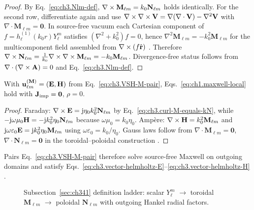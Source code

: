 \begin{proof}
By Eq.~\eqref{eq:ch3.Nlm-def}, $\nabla\times\mathbf{M}_{\ell m}=k_0\mathbf{N}_{\ell m}$ holds identically. For the second row, differentiate again and use $\nabla\times\nabla\times\mathbf{V}=\nabla(\nabla\cdot\mathbf{V})-\nabla^{2}\mathbf{V}$ with $\nabla\cdot\mathbf{M}_{\ell m}=\mathbf{0}$. In source-free vacuum each Cartesian component of $f=h_\ell^{(1)}(k_0 r)Y_\ell^m$ satisfies $(\nabla^{2}+k_0^{2})f=0$, hence $\nabla^{2}\mathbf{M}_{\ell m}=-k_0^{2}\mathbf{M}_{\ell m}$ for the multicomponent field assembled from $\nabla\times(f\hat{\mathbf{r}})$ \cite{jackson1999,stratton1941}. Therefore $\nabla\times\mathbf{N}_{\ell m}=\frac{1}{k_0}\nabla\times\nabla\times\mathbf{M}_{\ell m}=-k_0\mathbf{M}_{\ell m}$. Divergence-free status follows from $\nabla\cdot(\nabla\times\mathbf{A})=0$ and Eq.~\eqref{eq:ch3.Nlm-def}.
\end{proof}
\begin{theorem}
\label{thm:ch3.VSH-maxwell-pair}
With $\mathbf{u}_{\ell m}^{(\mathbf{M})}=(\mathbf{E},\mathbf{H})$ from Eq.~\eqref{eq:ch3.VSH-M-pair}, Eqs.~\eqref{eq:ch1.maxwell-local} hold with $\mathbf{J}_{\mathrm{imp}}=\mathbf{0}$, $\rho=0$.
\end{theorem}
\begin{proof}
Faraday: $\nabla\times\mathbf{E}=\mathrm{j}\eta_0 k_0^2\mathbf{N}_{\ell m}$ by Eq.~\eqref{eq:ch3.curl-M-equals-kN}, while $-\mathrm{j}\omega\mu_0\mathbf{H}=-\mathrm{j} k_0^2\eta_0\mathbf{N}_{\ell m}$ because $\omega\mu_0=k_0\eta_0$. Amp\`ere: $\nabla\times\mathbf{H}=k_0^2\mathbf{M}_{\ell m}$ and $\mathrm{j}\omega\varepsilon_0\mathbf{E}=\mathrm{j} k_0^2\eta_0\mathbf{M}_{\ell m}$ using $\omega\varepsilon_0=k_0/\eta_0$. Gauss laws follow from $\nabla\cdot\mathbf{M}_{\ell m}=\mathbf{0}$, $\nabla\cdot\mathbf{N}_{\ell m}=\mathbf{0}$ in the toroidal--poloidal construction \cite{stratton1941}.
\end{proof}
Pairs Eq.~\eqref{eq:ch3.VSH-M-pair} therefore solve source-free Maxwell on outgoing domains and satisfy
Eqs.~\eqref{eq:ch3.vector-helmholtz-E}--\eqref{eq:ch3.vector-helmholtz-H} \cite{stratton1941}.
\begin{figure}[t]
\centering
{}
\caption{Subsection~\ref{sec:ch341} definition ladder: scalar \(Y_{\ell}^{m}\) \(\to\) toroidal
\(\mathbf{M}_{\ell m}\) \(\to\) poloidal \(\mathbf{N}_{\ell m}\) with outgoing Hankel radial factors.}
\label{fig:ch3.vsh-definition-ladder}
\end{figure}
